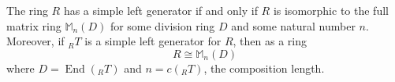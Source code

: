 The ring $R$ has a simple left generator if and only if $R$ is isomorphic to the full matrix ring $\mathbb{M}_n(D)$ for some division ring $D$ and some natural number $n$. Moreover, if ${}_R T$ is a simple left generator for $R$, then as a ring
$$R \cong \mathbb{M}_n(D)$$
where $D = \operatorname{End}({}_R T)$ and $n = c({}_R T)$, the composition length.
